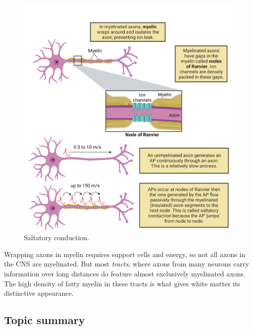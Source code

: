\documentclass[
]{book}
\begin{document}
\begin{figure}

{\centering \includegraphics[width=0.9\linewidth]{images/ch02/02_27} 

}

\caption{Saltatory conduction.}\label{fig:saltatory-conduction}
\end{figure}

Wrapping axons in myelin requires support cells and energy, so not all axons in the CNS are myelinated. But most \emph{tracts}, where axons from many neurons carry information over long distances do feature almost exclusively myelinated axons. The high density of fatty myelin in these tracts is what gives white matter its distinctive appearance.

\hypertarget{topic-summary-3}{%
\subsection{Topic summary}\label{topic-summary-3}}
\end{document}
